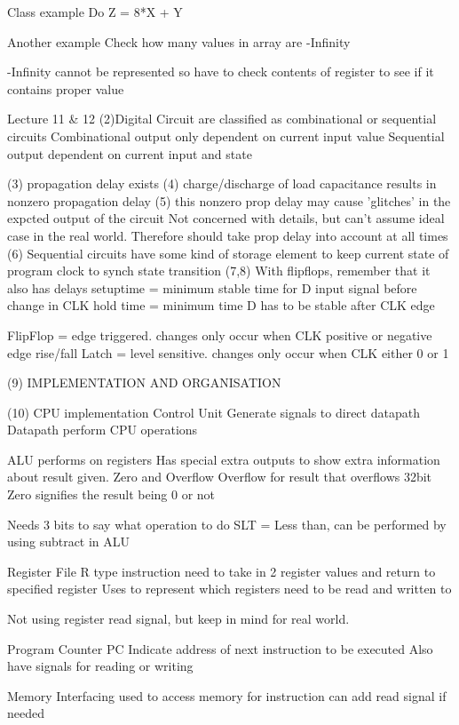 \documentclass{article}
\begin{document}
	Class example
		Do Z = 8*X + Y

	Another example
		Check how many values in array are -Infinity

		-Infinity cannot be represented so have to check contents of register to see if it contains proper value

Lecture 11 \& 12
	(2)Digital Circuit are classified as combinational or sequential circuits
		Combinational	output only dependent on current input value
		Sequential 	output dependent on current input and state

	(3) propagation delay exists
	(4) charge/discharge of load capacitance results in nonzero propagation delay
	(5) this nonzero prop delay may cause 'glitches' in the expcted output of the circuit
		Not concerned with details, but can't assume ideal case in the real world. Therefore should take prop delay into account at all times
	(6) Sequential circuits
		have some kind of storage element to keep current state of program
		clock to synch state transition
	(7,8) With flipflops, remember that it also has delays
		setuptime = minimum stable time for D input signal before change in CLK
		hold time = minimum time D has to be stable after CLK edge

		FlipFlop = edge triggered. changes only occur when CLK positive or negative edge rise/fall
		Latch = level sensitive. changes only occur when CLK either 0 or 1

	(9) IMPLEMENTATION AND ORGANISATION

	(10) CPU implementation
		Control Unit
			Generate signals to direct datapath
		Datapath
			perform CPU operations

		ALU performs on registers
			Has special extra outputs to show extra information about result given. Zero and Overflow
			Overflow for result that overflows 32bit
			Zero signifies the result being 0 or not

			Needs 3 bits to say what operation to do
			SLT = Less than, can be performed by using subtract in ALU


		Register File
			R type instruction need to take in 2 register values and return to specified register
			Uses to represent which registers need to be read and written to

			Not using register read signal, but keep in mind for real world.

		Program Counter PC
			Indicate address of next instruction to be executed
			Also have signals for reading or writing

		Memory Interfacing
			used to access memory for instruction
			can add read signal if needed
\end{document}
